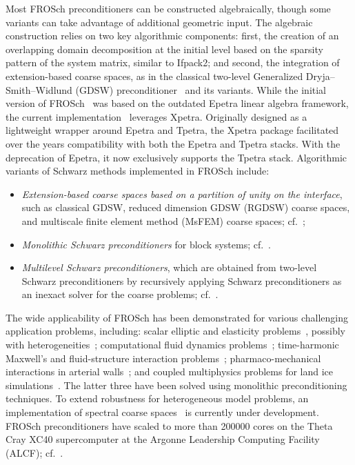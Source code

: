Most FROSch preconditioners can be constructed algebraically, though some variants can take advantage of additional geometric input. The algebraic construction relies on two key algorithmic components: first, the creation of an overlapping domain decomposition at the initial level based on the sparsity pattern of the system matrix, similar to Ifpack2; and second, the integration of extension-based coarse spaces, as in the classical two-level Generalized Dryja--Smith--Widlund (GDSW) preconditioner~\cite{dohrmann_domain_2008} and its variants. While the initial version of FROSch~\cite{heinlein_parallel_2016} was based on the outdated Epetra linear algebra framework, the current implementation~\cite{heinlein_frosch_2020} leverages Xpetra. Originally designed as a lightweight wrapper around Epetra and Tpetra, the Xpetra package facilitated over the years compatibility with both the Epetra and Tpetra stacks. With the deprecation of Epetra, it now exclusively supports the Tpetra stack. Algorithmic variants of Schwarz methods implemented in FROSch include:
\begin{itemize}
	\item \emph{Extension-based coarse spaces based on a partition of unity on the interface}, such as classical GDSW, reduced dimension GDSW (RGDSW) coarse spaces, and multiscale finite element method (MsFEM) coarse spaces; cf.~\cite{heinlein_parallel_2016,heinlein_improving_2018};
	\item \emph{Monolithic Schwarz preconditioners} for block systems; cf.~\cite{heinlein_monolithic_2019}.
	\item \emph{Multilevel Schwarz preconditioners}, which are obtained from two-level Schwarz preconditioners by recursively applying Schwarz preconditioners as an inexact solver for the coarse problems; cf.~\cite{heinlein_parallel_2022}.
\end{itemize}

The wide applicability of FROSch has been demonstrated for various challenging application problems, including: scalar elliptic and elasticity problems~\cite{heinlein_parallel_2016}, possibly with heterogeneities~\cite{alves2024computationalstudyalgebraiccoarse}; computational fluid dynamics problems~\cite{heinlein_monolithic_2019,heinlein_comparison_2025}; time-harmonic Maxwell's and fluid-structure interaction problems~\cite{heinlein2024couplingdealiifroschsustainable}; pharmaco-mechanical interactions in arterial walls~\cite{balzani_computational_nodate}; and coupled multiphysics problems for land ice simulations~\cite{heinlein_frosch_2022}. The latter three have been solved using monolithic preconditioning techniques. To extend robustness for heterogeneous model problems, an implementation of spectral coarse spaces~\cite{heinlein_adaptive_2019} is currently under development. FROSch preconditioners have scaled to more than \num{200000} cores on the Theta Cray XC40 supercomputer at the Argonne Leadership Computing Facility (ALCF); cf.~\cite{heinlein_parallel_2022}.

